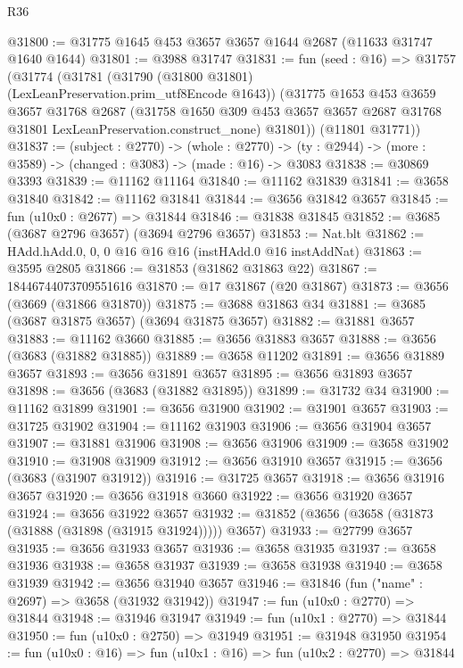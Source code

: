 \begin{lexlean}{R36}
\begin{coremodule}
@31800 := @31775 @1645 @453 @3657 @3657 @1644 @2687 (@11633 @31747 @1640 @1644)
@31801 := @3988 @31747
@31831 := fun (seed : @16) =>
  @31757
    (@31774
      (@31781
        (@31790 (@31800 @31801) (LexLeanPreservation.prim_utf8Encode @1643))
        (@31775
          @1653
          @453
          @3659
          @3657
          @31768
          @2687
          (@31758
            @1650
            @309
            @453
            @3657
            @3657
            @2687
            @31768
            @31801
            LexLeanPreservation.construct_none)
          @31801))
      (@11801 @31771))
@31837 := (subject : @2770) ->
  (whole : @2770) -> (ty : @2944) -> (more : @3589) -> (changed : @3083) -> (made : @16) -> @3083
@31838 := @30869 @3393
@31839 := @11162 @11164
@31840 := @11162 @31839
@31841 := @3658 @31840
@31842 := @11162 @31841
@31844 := @3656 @31842 @3657
@31845 := fun (u10x0 : @2677) => @31844
@31846 := @31838 @31845
@31852 := @3685 (@3687 @2796 @3657) (@3694 @2796 @3657)
@31853 := Nat.blt
@31862 := HAdd.hAdd.{0, 0, 0} @16 @16 @16 (instHAdd.{0} @16 instAddNat)
@31863 := @3595 @2805
@31866 := @31853 (@31862 @31863 @22)
@31867 := 18446744073709551616
@31870 := @17 @31867 (@20 @31867)
@31873 := @3656 (@3669 (@31866 @31870))
@31875 := @3688 @31863 @34
@31881 := @3685 (@3687 @31875 @3657) (@3694 @31875 @3657)
@31882 := @31881 @3657
@31883 := @11162 @3660
@31885 := @3656 @31883 @3657
@31888 := @3656 (@3683 (@31882 @31885))
@31889 := @3658 @11202
@31891 := @3656 @31889 @3657
@31893 := @3656 @31891 @3657
@31895 := @3656 @31893 @3657
@31898 := @3656 (@3683 (@31882 @31895))
@31899 := @31732 @34
@31900 := @11162 @31899
@31901 := @3656 @31900
@31902 := @31901 @3657
@31903 := @31725 @31902
@31904 := @11162 @31903
@31906 := @3656 @31904 @3657
@31907 := @31881 @31906
@31908 := @3656 @31906
@31909 := @3658 @31902
@31910 := @31908 @31909
@31912 := @3656 @31910 @3657
@31915 := @3656 (@3683 (@31907 @31912))
@31916 := @31725 @3657
@31918 := @3656 @31916 @3657
@31920 := @3656 @31918 @3660
@31922 := @3656 @31920 @3657
@31924 := @3656 @31922 @3657
@31932 := @31852 (@3656 (@3658 (@31873 (@31888 (@31898 (@31915 @31924))))) @3657)
@31933 := @27799 @3657
@31935 := @3656 @31933 @3657
@31936 := @3658 @31935
@31937 := @3658 @31936
@31938 := @3658 @31937
@31939 := @3658 @31938
@31940 := @3658 @31939
@31942 := @3656 @31940 @3657
@31946 := @31846 (fun ("name" : @2697) => @3658 (@31932 @31942))
@31947 := fun (u10x0 : @2770) => @31844
@31948 := @31946 @31947
@31949 := fun (u10x1 : @2770) => @31844
@31950 := fun (u10x0 : @2750) => @31949
@31951 := @31948 @31950
@31954 := fun (u10x0 : @16) => fun (u10x1 : @16) => fun (u10x2 : @2770) => @31844

\end{coremodule}
\end{lexlean}
